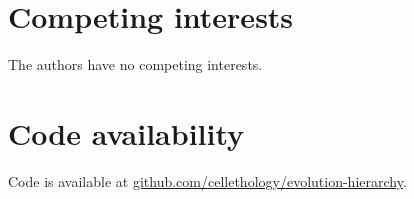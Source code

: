 \documentclass[twocolumn]{article}
\begin{document}
\section*{Competing interests}
The authors have no competing interests.

\section*{Code availability}
Code is available at \url{github.com/cellethology/evolution-hierarchy}.

\newpage





\end{document}
